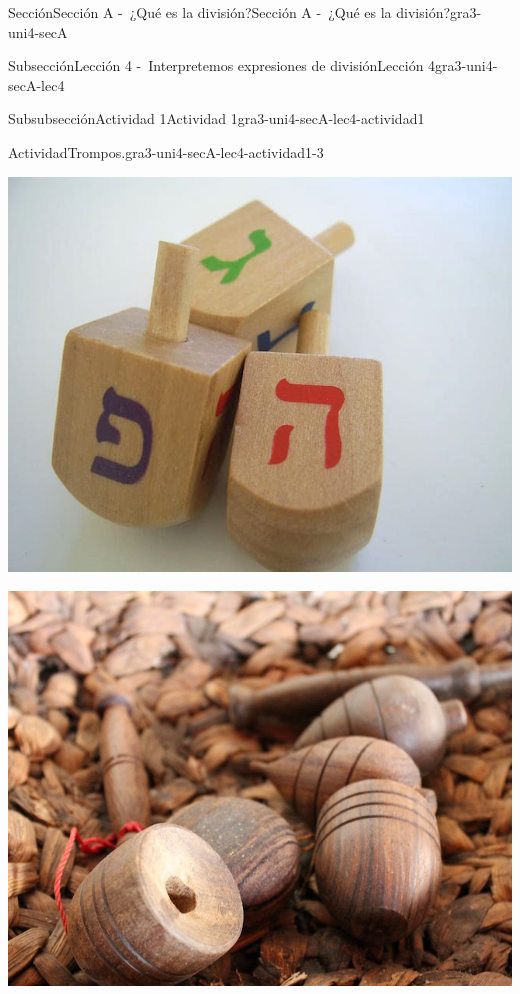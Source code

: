 \documentclass[twoside,10pt,]{article}
\begin{document}
\begin{sectionptx}{Sección}{Sección A -~¿Qué es la división?}{}{Sección A -~¿Qué es la división?}{}{}{gra3-uni4-secA}
\begin{subsectionptx}{Subsección}{Lección 4 -~Interpretemos expresiones de división}{}{Lección 4}{}{}{gra3-uni4-secA-lec4}
\begin{subsubsectionptx}{Subsubsección}{Actividad 1}{}{Actividad 1}{}{}{gra3-uni4-secA-lec4-actividad1}
\begin{activity}{Actividad}{Trompos.}{gra3-uni4-secA-lec4-actividad1-3}
\begin{sidebyside}{5}{0}{0}{0}
\begin{sbspanel}{0.2}
\includegraphics[width=\linewidth]{external/jpg-source/V1 3.4.A.4 Dreidels.jpg}
\end{sbspanel}%
\begin{sbspanel}{0.2}%
\includegraphics[width=\linewidth]{external/jpg-source/V1 3.4.A.4 Indonesian Gasing.jpg}
\end{sbspanel}%
\begin{sbspanel}{0.2}%

\end{sbspanel}
\end{sidebyside}
\end{activity}
\end{subsubsectionptx}
\end{subsectionptx}
\end{sectionptx}
\end{document}
